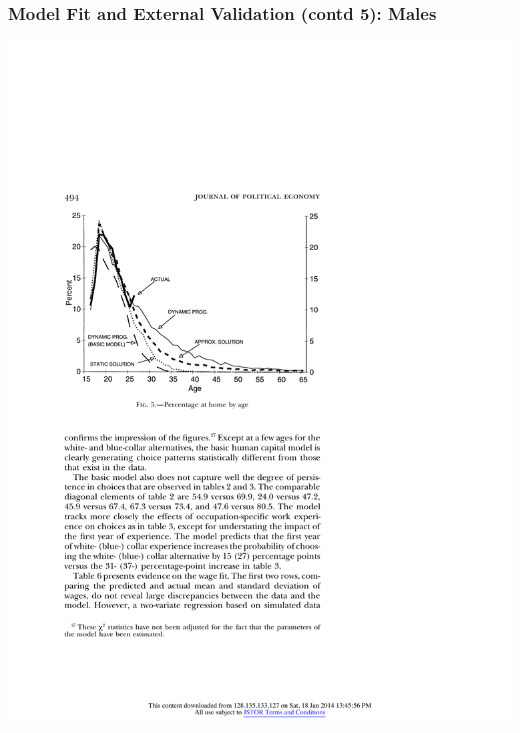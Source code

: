\begin{frame}
	\frametitle{Model Fit and External Validation (contd 5): Males}
	\begin{center}
	\includegraphics[width=.9\textwidth]{tab-figs/figure5_1997}
	\end{center}
\end{frame}

